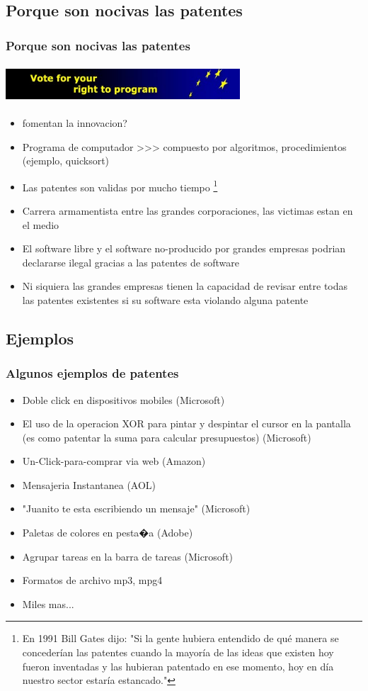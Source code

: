 \subsection{Porque son nocivas las patentes}
\frame
{
	\frametitle{Porque son nocivas las patentes}

	\begin{center}
	\includegraphics[width=248pt,height=40pt]{nopatents.png}
	\end{center}

	\begin{itemize}
	\item {fomentan la innovacion?}
	\item {Programa de computador >>> compuesto por algoritmos, procedimientos (ejemplo, quicksort)}
	\item {Las patentes son validas por mucho tiempo \footnote{En 1991 Bill Gates dijo: "Si la gente hubiera entendido de qué manera se concederían las patentes cuando la mayoría de las ideas que existen hoy fueron inventadas y las hubieran patentado en ese momento, hoy en día nuestro sector estaría estancado."}}
	\item {Carrera armamentista entre las grandes corporaciones, las victimas estan en el medio}
	\item {El software libre y el software no-producido por grandes empresas podrian declararse ilegal gracias a las patentes de software}
	\item {Ni siquiera las grandes empresas tienen la capacidad de revisar entre todas las patentes existentes si su software esta violando alguna patente}
	\end{itemize}
}

% 
\subsection{Ejemplos}
\frame
{
	\frametitle{Algunos ejemplos de patentes}
	\begin{itemize}
	\item {Doble click en dispositivos mobiles (Microsoft)}
	\item {El uso de la operacion XOR para pintar y despintar el cursor en la pantalla (es como patentar la suma para calcular presupuestos)  (Microsoft)}
	\item {Un-Click-para-comprar via web (Amazon)}
	\item {Mensajeria Instantanea (AOL)}
	\item {"Juanito te esta escribiendo un mensaje" (Microsoft)}
	\item {Paletas de colores en pesta�a (Adobe)}
	\item {Agrupar tareas en la barra de tareas (Microsoft)}
	\item {Formatos de archivo mp3, mpg4}
	\item {Miles mas...}
	\end{itemize}
}


